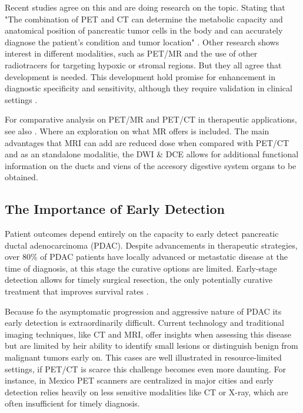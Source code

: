 Recent studies agree on this and are doing research on the topic. Stating that "The combination of PET and CT can determine the metabolic capacity and anatomical position of pancreatic tumor cells in the body and can accurately diagnose the patient's condition and tumor location" \cite{Pu2021}. Other research shows interest in different modalities, such as PET/MR and the use of other radiotracers for targeting hypoxic or stromal regions. But they all agree that development is needed. This development hold promise for enhancement in diagnostic specificity and sensitivity, although they require validation in clinical settings \cite{Cancers2023}. 


For comparative analysis on PET/MR and PET/CT in therapeutic applications, see also \cite{myownotherpaper}. Where an exploration on what MR offers is included. The main advantages that MRI can add are reduced dose when compared with PET/CT and as an standalone modalitie, the DWI \& DCE allows for additional functional information on the ducts and viens of the accesory digestive system organs to be obtained.


\subsection{The Importance of Early Detection}

Patient outcomes depend entirely on the capacity to early detect pancreatic ductal adenocarcinoma (PDAC). Despite advancements in therapeutic strategies, over 80\% of PDAC patients have locally advanced or metastatic disease at the time of diagnosis, at this stage the curative options are limited. Early-stage detection allows for timely surgical resection, the only potentially curative treatment that improves survival rates \cite{Cancers2023}. 

Because fo the asymptomatic progression and aggressive nature of PDAC its early detection is extraordinarily difficult. Current technology and traditional imaging techniques, like CT and MRI, offer insights when assessing this disease but are limited by heir ability to identify small lesions or distinguish benign from malignant tumors early on. This cases are well illustrated in resource-limited settings, if PET/CT is scarce this challenge becomes even more daunting. For instance, in Mexico PET scanners are centralized in major cities and early detection relies heavily on less sensitive modalities like CT or X-ray, which are often insufficient for timely diagnosis.

